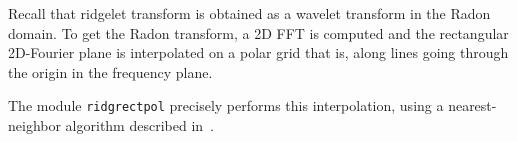 Recall that ridgelet transform is obtained as a wavelet transform in the Radon domain.
To get the Radon transform, a 2D FFT is computed and the rectangular 2D-Fourier plane 
is interpolated on a polar grid that is, along lines going through the origin in the
frequency plane.

The module {\tt ridgrectpol} precisely performs this interpolation, using a
nearest-neighbor algorithm described in~\cite{starck.candes.ea:curvelet}.
